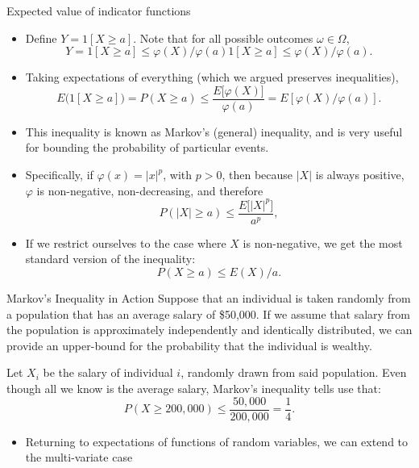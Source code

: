 \begin{frame}[allowframebreaks]{Expected value of indicator functions}
\begin{itemize}
    \framebreak
    
    \item Define $Y = 1[X \geq a]$. Note that for all possible outcomes $\omega \in \Omega$, 
    $$
    Y = 1[X \geq a] \leq \varphi(X) / \varphi(a) 1[X \geq a] \leq \varphi(X) / \varphi(a).
    $$
    \item Taking expectations of everything (which we argued preserves inequalities),
    $$
    E\big(1[X \geq a]\big) = P(X \geq a) \leq \frac{E\big[\varphi(X)\big]}{\varphi(a)} = E\left[\varphi(X) / \varphi(a)\right].
    $$
    \item This inequality is known as \alert{Markov's (general) inequality}, and is very useful for bounding the probability of particular events. 
    \item Specifically, if $\varphi(x) = |x|^p$, with $p > 0$, then because $|X|$ is always positive, $\varphi$ is non-negative, non-decreasing, and therefore
    $$
    P(|X| \geq a) \leq \frac{E\big[|X|^p\big]}{a^p},
    $$
    \item If we restrict ourselves to the case where $X$ is non-negative, we get the most standard version of the inequality:
    $$
    P(X \geq a) \leq E(X) / a.
    $$
  \end{itemize}

  \framebreak

  \begin{exampleblock}{Markov's Inequality in Action}
    Suppose that an individual is taken randomly from a population that has an average salary of \$50,000. If we assume that salary from the population is approximately independently and identically distributed, we can provide an upper-bound for the probability that the individual is wealthy.
    
    Let $X_i$ be the salary of individual $i$, randomly drawn from said population. Even though all we know is the average salary, Markov's inequality tells use that:
    $$
    P(X \geq 200,000) \leq \frac{50,000}{200,000} = \frac{1}{4}. 
    $$
  \end{exampleblock}

  \framebreak

  \begin{itemize}
    \item Returning to expectations of functions of random variables, we can extend to the multi-variate case
  \end{itemize}
  

\end{frame}
